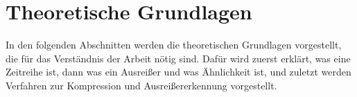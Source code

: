 \chapter{Theoretische Grundlagen}\label{ch:theoretischegrundlagen}
In den folgenden Abschnitten werden die theoretischen Grundlagen vorgestellt, die für das Verständnis der Arbeit nötig sind. Dafür wird zuerst erklärt, was eine Zeitreihe ist, dann was ein Ausreißer und was Ähnlichkeit ist, und zuletzt werden Verfahren zur Kompression und Ausreißererkennung vorgestellt.




